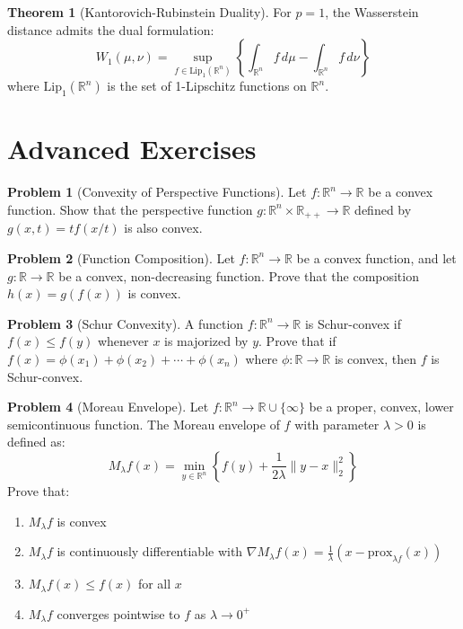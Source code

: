 \documentclass[12pt,a4paper]{article}
\theoremstyle{definition}
\newtheorem{theorem}{Theorem}[section]
\newtheorem{problem}{Problem}[section]
\begin{document}
\begin{theorem}[Kantorovich-Rubinstein Duality]
For $p = 1$, the Wasserstein distance admits the dual formulation:
\[W_1(\mu, \nu) = \sup_{f \in \text{Lip}_1(\mathbb{R}^n)} \left\{\int_{\mathbb{R}^n} f \, d\mu - \int_{\mathbb{R}^n} f \, d\nu\right\}\]
where $\text{Lip}_1(\mathbb{R}^n)$ is the set of 1-Lipschitz functions on $\mathbb{R}^n$.
\end{theorem}

\section{Advanced Exercises}

\begin{problem}[Convexity of Perspective Functions]
Let $f: \mathbb{R}^n \to \mathbb{R}$ be a convex function. Show that the perspective function $g: \mathbb{R}^n \times \mathbb{R}_{++} \to \mathbb{R}$ defined by $g(x, t) = t f(x/t)$ is also convex.
\end{problem}

\begin{problem}[Function Composition]
Let $f: \mathbb{R}^n \to \mathbb{R}$ be a convex function, and let $g: \mathbb{R} \to \mathbb{R}$ be a convex, non-decreasing function. Prove that the composition $h(x) = g(f(x))$ is convex.
\end{problem}

\begin{problem}[Schur Convexity]
A function $f: \mathbb{R}^n \to \mathbb{R}$ is Schur-convex if $f(x) \leq f(y)$ whenever $x$ is majorized by $y$. Prove that if $f(x) = \phi(x_1) + \phi(x_2) + \cdots + \phi(x_n)$ where $\phi: \mathbb{R} \to \mathbb{R}$ is convex, then $f$ is Schur-convex.
\end{problem}

\begin{problem}[Moreau Envelope]
Let $f: \mathbb{R}^n \to \mathbb{R} \cup \{\infty\}$ be a proper, convex, lower semicontinuous function. The Moreau envelope of $f$ with parameter $\lambda > 0$ is defined as:
\[M_\lambda f(x) = \min_{y \in \mathbb{R}^n} \left\{f(y) + \frac{1}{2\lambda}\|y - x\|_2^2\right\}\]
Prove that:
\begin{enumerate}[label=(\alph*)]
\item $M_\lambda f$ is convex
\item $M_\lambda f$ is continuously differentiable with $\nabla M_\lambda f(x) = \frac{1}{\lambda}(x - \text{prox}_{\lambda f}(x))$
\item $M_\lambda f(x) \leq f(x)$ for all $x$
\item $M_\lambda f$ converges pointwise to $f$ as $\lambda \to 0^+$
\end{enumerate}
\end{problem}
\end{document}
